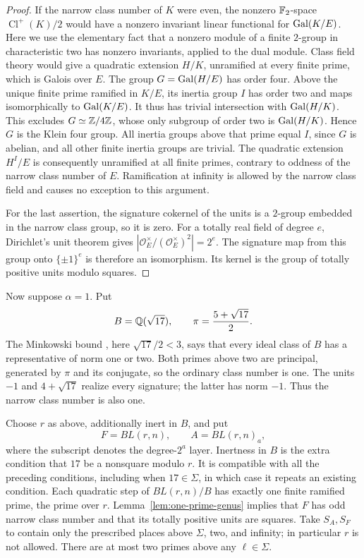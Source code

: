 \begin{proof}
If the narrow class number of $K$ were even, the nonzero
$\mathbb F_2$-space $\operatorname{Cl}^+(K)/2$ would have a nonzero
invariant linear functional for $\operatorname{Gal}(K/E)$.  Here we use the
elementary fact that a nonzero module of a finite $2$-group in
characteristic two has nonzero invariants, applied to the dual module.
Class field theory would give a quadratic extension $H/K$,
unramified at every finite prime, which is Galois over $E$.
The group $G=\operatorname{Gal}(H/E)$ has order four.  Above the unique finite prime
ramified in $K/E$, its inertia group $I$ has order two and maps
isomorphically to $\operatorname{Gal}(K/E)$.  It thus has trivial intersection with
$\operatorname{Gal}(H/K)$.  This excludes $G\simeq\mathbb Z/4\mathbb Z$, whose only subgroup
of order two is $\operatorname{Gal}(H/K)$.  Hence $G$ is the Klein four group.
All inertia groups above that prime equal $I$, since $G$ is abelian,
and all other finite inertia groups are trivial.  The quadratic
extension $H^I/E$ is consequently unramified at all finite primes,
contrary to oddness of the narrow class number of $E$.  Ramification
at infinity is allowed by the narrow class field and causes no
exception to this argument.

For the last assertion, the signature cokernel of the units is a
$2$-group embedded in the narrow class group, so it is zero.
For a totally real field of degree $e$, Dirichlet's unit theorem
\cite[Theorem~5.1]{MilneANT} gives
$|\mathcal O_E^\times/(\mathcal O_E^\times)^2|=2^e$.
The signature map from this group onto $\{\pm1\}^e$ is therefore
an isomorphism.  Its kernel is the group of totally positive units
modulo squares.
\end{proof}

Now suppose $\alpha=1$.  Put
\[
 B=\mathbb Q(\sqrt{17}),\qquad
 \pi=\frac{5+\sqrt{17}}2.
\]
The Minkowski bound \cite[Theorem~4.3]{MilneANT}, here
$\sqrt{17}/2<3$, says that every ideal class of
$B$ has a representative of norm one or two.  Both primes above two
are principal, generated by $\pi$ and its conjugate, so the ordinary
class number is one.  The units $-1$ and $4+\sqrt{17}$ realize every
signature; the latter has norm $-1$.  Thus the narrow class number
is also one.

Choose $r$ as above, additionally inert in $B$, and put
\[
       F=B L(r,n),\qquad A=B L(r,n)_a,
\]
where the subscript denotes the degree-$2^a$ layer.  Inertness in
$B$ is the extra condition that $17$ be a nonsquare modulo $r$.
It is compatible with all the preceding conditions, including when
$17\in\Sigma$, in which case it repeats an existing condition.
Each quadratic step of $B L(r,n)/B$ has exactly one finite ramified
prime, the prime over $r$.  Lemma~\ref{lem:one-prime-genus} implies
that $F$ has odd narrow class number and that its totally positive
units are squares.  Take $S_A,S_F$ to contain only the prescribed
places above $\Sigma$, two, and infinity; in particular $r$ is not
allowed.  There are at most two primes above any $\ell\in\Sigma$.

